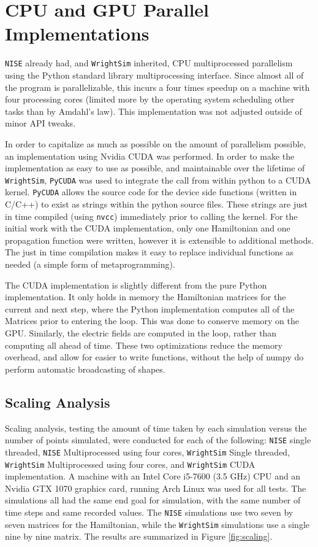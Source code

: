 \documentclass[fontsize=11pt]{scrartcl}
\numberwithin{equation}{section}		%
\numberwithin{figure}{section}			%
\numberwithin{table}{section}				%
\begin{document}
\section{CPU and GPU Parallel Implementations}

\texttt{NISE} already had, and \texttt{WrightSim} inherited, CPU multiprocessed parallelism using the Python standard library multiprocessing interface.
Since almost all of the program is parallelizable, this incurs a four times speedup on a machine with four processing cores (limited more by the operating system scheduling other tasks than by Amdahl's law).
This implementation was not adjusted outside of minor API tweaks.

In order to capitalize as much as possible on the amount of parallelism possible, an implementation using Nvidia CUDA \cite{Nickolls_2008} was performed. In order to make the implementation as easy to use as possible, and maintainable over the lifetime of \texttt{WrightSim}, \texttt{PyCUDA} was used to integrate the call from within python to a CUDA kernel.
\texttt{PyCUDA} allows the source code for the device side functions (written in C/C++) to exist as strings within the python source files. These strings are just in time compiled (using \texttt{nvcc}) immediately prior to calling the kernel.
For the initial work with the CUDA implementation, only one Hamiltonian and one propagation function were written, however it is extensible to additional methods.
The just in time compilation makes it easy to replace individual functions as needed (a simple form of metaprogramming).

The CUDA implementation is slightly different from the pure Python implementation.
It only holds in memory the Hamiltonian matrices for the current and next step, where the Python implementation computes all of the Matrices prior to entering the loop.
This was done to conserve memory on the GPU.
Similarly, the electric fields are computed in the loop, rather than computing all ahead of time.
These two optimizations reduce the memory overhead, and allow for easier to write functions, without the help of numpy do perform automatic broadcasting of shapes.

\subsection{Scaling Analysis}

Scaling analysis, testing the amount of time taken by each simulation versus the number of points simulated, were conducted for each of the following: \texttt{NISE} single threaded, \texttt{NISE} Multiprocessed using four cores, \texttt{WrightSim} Single threaded, \texttt{WrightSim} Multiprocessed using four cores, and \texttt{WrightSim} CUDA implementation.
A machine with an Intel Core i5-7600 (3.5 GHz)  CPU and an Nvidia GTX 1070 graphics card, running Arch Linux was used for all tests.
The simulations all had the same end goal for simulation, with the same number of time steps and same recorded values.
The \texttt{NISE} simulations use two seven by seven matrices for the Hamiltonian, while the \texttt{WrightSim} simulations use a single nine by nine matrix.
The results are summarized in Figure \ref{fig:scaling}.
\end{document}
